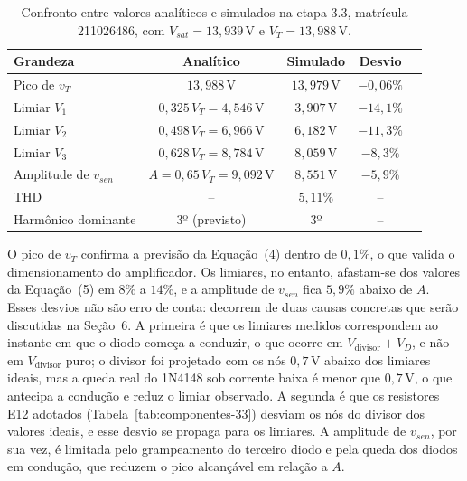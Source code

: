 \documentclass[11pt,a4paper]{article}
\begin{document}
\begin{table}[htb]
\centering
\caption{Confronto entre valores analíticos e simulados na etapa 3.3, matrícula 211026486, com \(V_{sat} = 13{,}939\,\mathrm{V}\) e \(V_T = 13{,}988\,\mathrm{V}\).}
\label{tab:resultados-33}
\begin{tabular}{lcccc}
\hline
Grandeza & Analítico & Simulado & Desvio \\
\hline
Pico de \(v_T\) & \(13{,}988\,\mathrm{V}\) & \(13{,}979\,\mathrm{V}\) & \(-0{,}06\%\) \\
Limiar \(V_1\) & \(0{,}325\,V_T = 4{,}546\,\mathrm{V}\) & \(3{,}907\,\mathrm{V}\) & \(-14{,}1\%\) \\
Limiar \(V_2\) & \(0{,}498\,V_T = 6{,}966\,\mathrm{V}\) & \(6{,}182\,\mathrm{V}\) & \(-11{,}3\%\) \\
Limiar \(V_3\) & \(0{,}628\,V_T = 8{,}784\,\mathrm{V}\) & \(8{,}059\,\mathrm{V}\) & \(-8{,}3\%\) \\
Amplitude de \(v_{sen}\) & \(A = 0{,}65\,V_T = 9{,}092\,\mathrm{V}\) & \(8{,}551\,\mathrm{V}\) & \(-5{,}9\%\) \\
THD & -- & \(5{,}11\%\) & -- \\
Harmônico dominante & 3º (previsto) & 3º & -- \\
\hline
\end{tabular}
\end{table}

O pico de \(v_T\) confirma a previsão da Equação~(4) dentro de \(0{,}1\%\), o que valida o dimensionamento do amplificador. Os limiares, no entanto, afastam-se dos valores da Equação~(5) em \(8\%\) a \(14\%\), e a amplitude de \(v_{sen}\) fica \(5{,}9\%\) abaixo de \(A\). Esses desvios não são erro de conta: decorrem de duas causas concretas que serão discutidas na Seção~6. A primeira é que os limiares medidos correspondem ao instante em que o diodo começa a conduzir, o que ocorre em \(V_{\text{divisor}} + V_D\), e não em \(V_{\text{divisor}}\) puro; o divisor foi projetado com os nós \(0{,}7\,\mathrm{V}\) abaixo dos limiares ideais, mas a queda real do 1N4148 sob corrente baixa é menor que \(0{,}7\,\mathrm{V}\), o que antecipa a condução e reduz o limiar observado. A segunda é que os resistores E12 adotados (Tabela~\ref{tab:componentes-33}) desviam os nós do divisor dos valores ideais, e esse desvio se propaga para os limiares. A amplitude de \(v_{sen}\), por sua vez, é limitada pelo grampeamento do terceiro diodo e pela queda dos diodos em condução, que reduzem o pico alcançável em relação a \(A\).
\end{document}
